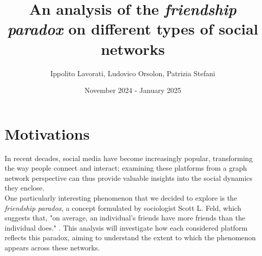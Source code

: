 \documentclass{article}
\title{An analysis of the \textit{friendship paradox} on different types of social networks}
\author{Ippolito Lavorati, Ludovico Orsolon, Patrizia Stefani}
\date{November 2024 - January 2025}
\begin{document}
\maketitle
\section{Motivations}
In recent decades, social media have become increasingly popular, transforming the way people connect and interact; examining these platforms from a graph network perspective can thus provide valuable insights into the social dynamics they enclose.\\
One particularly interesting phenomenon that we decided to explore is the \textit{friendship paradox}, a concept formulated by sociologist Scott L. Feld, which suggests that, "on average, an individual's friends have more friends than the individual does." \cite{friendship_paradox}.
This analysis will investigate how each considered platform reflects this paradox, aiming to understand the extent to which the phenomenon appears across these networks.
\end{document}
